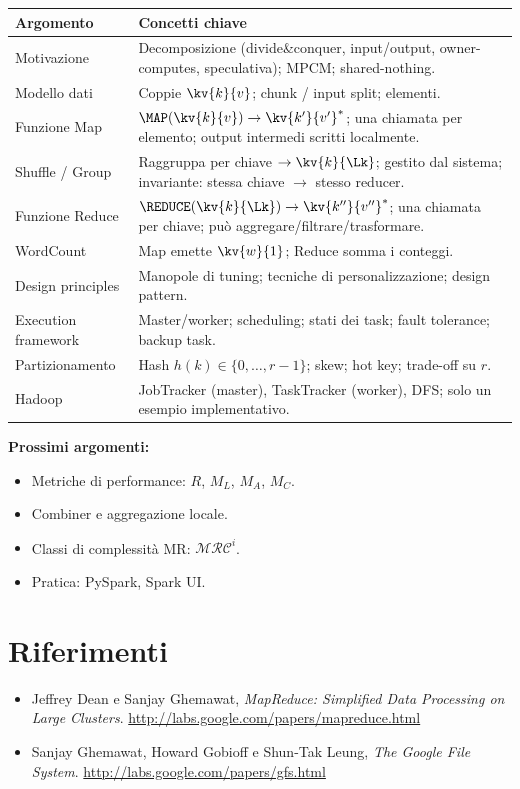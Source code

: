 \begin{tabular}{@{}lp{9cm}@{}}
  \toprule
  \textbf{Argomento} & \textbf{Concetti chiave} \\
  \midrule
  Motivazione &
    Decomposizione (divide\&conquer, input/output, owner-computes, speculativa);
    MPCM; shared-nothing. \\[4pt]
  Modello dati &
    Coppie $\kv{k}{v}$; chunk / input split; elementi. \\[4pt]
  Funzione Map &
    $\MAP(\kv{k}{v}) \to \kv{k'}{v'}^*$; una chiamata per elemento;
    output intermedi scritti localmente. \\[4pt]
  Shuffle / Group &
    Raggruppa per chiave $\to \kv{k}{\Lk}$; gestito dal sistema;
    invariante: stessa chiave $\to$ stesso reducer. \\[4pt]
  Funzione Reduce &
    $\REDUCE(\kv{k}{\Lk}) \to \kv{k''}{v''}^*$; una chiamata per chiave;
    può aggregare/filtrare/trasformare. \\[4pt]
  WordCount &
    Map emette $\kv{w}{1}$; Reduce somma i conteggi. \\[4pt]
  Design principles &
    Manopole di tuning; tecniche di personalizzazione; design pattern. \\[4pt]
  Execution framework &
    Master/worker; scheduling; stati dei task; fault tolerance;
    backup task. \\[4pt]
  Partizionamento &
    Hash $h(k) \in \{0,\ldots,r-1\}$; skew; hot key; trade-off su $r$. \\[4pt]
  Hadoop &
    JobTracker (master), TaskTracker (worker), DFS; solo un esempio
    implementativo. \\
  \bottomrule
\end{tabular}

\vspace{1em}
\begin{importante}
  \textbf{Prossimi argomenti:}
  \begin{itemize}
    \item Metriche di performance: $R$, $M_L$, $M_A$, $M_C$.
    \item Combiner e aggregazione locale.
    \item Classi di complessità MR: $\mathcal{MRC}^i$.
    \item Pratica: PySpark, Spark UI.
  \end{itemize}
\end{importante}

\section*{Riferimenti}
\begin{itemize}
  \item Jeffrey Dean e Sanjay Ghemawat,
    \textit{MapReduce: Simplified Data Processing on Large Clusters}.
    \url{http://labs.google.com/papers/mapreduce.html}
  \item Sanjay Ghemawat, Howard Gobioff e Shun-Tak Leung,
    \textit{The Google File System}.
    \url{http://labs.google.com/papers/gfs.html}
\end{itemize}
